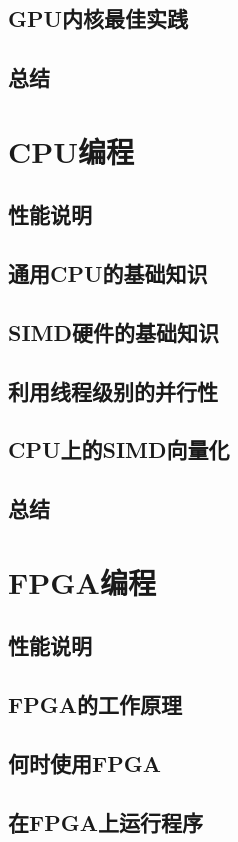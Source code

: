 \documentclass[11pt,a4paper,UTF8]{ctexart}
\begin{document}
		\subsection{GPU内核最佳实践}
		\subsection{总结}
	\section{CPU编程}
		\subsection{性能说明}
		\subsection{通用CPU的基础知识}
		\subsection{SIMD硬件的基础知识}
		\subsection{利用线程级别的并行性}
		\subsection{CPU上的SIMD向量化}
		\subsection{总结}
	\section{FPGA编程}
		\subsection{性能说明}
		\subsection{FPGA的工作原理}
		\subsection{何时使用FPGA}
		\subsection{在FPGA上运行程序}
\end{document}
